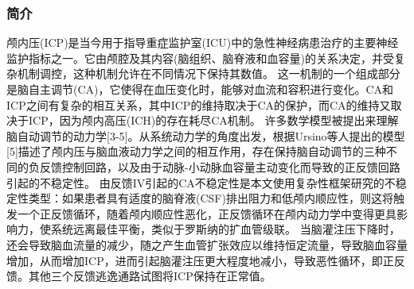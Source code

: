 \documentclass[titlepage,12pt]{article}
\begin{document}
\subsubsection{简介}
颅内压(ICP)是当今用于指导重症监护室(ICU)中的急性神经病患治疗的主要神经监护指标之一。它由颅腔及其内容(脑组织、脑脊液和血容量)的关系决定，并受复杂机制调控，这种机制允许在不同情况下保持其数值。
这一机制的一个组成部分是脑自主调节(CA)，它使得在血压变化时，能够对血流和容积进行变化。CA和ICP之间有复杂的相互关系，其中ICP的维持取决于CA的保护，而CA的维持又取决于ICP，因为颅内高压(ICH)的存在耗尽CA机制。
许多数学模型被提出来理解脑自动调节的动力学[3-5]。从系统动力学的角度出发，根据Ursino等人提出的模型[5]描述了颅内压与脑血液动力学之间的相互作用，存在保持脑自动调节的三种不同的负反馈控制回路，以及由于动脉-小动脉血容量主动变化而导致的正反馈回路引起的不稳定性。
由反馈IV引起的CA不稳定性是本文使用复杂性框架研究的不稳定性类型：如果患者具有适度的脑脊液(CSF)排出阻力和低颅内顺应性，则这将触发一个正反馈循环，随着颅内顺应性恶化，正反馈循环在颅内动力学中变得更具影响力，使系统远离最佳平衡，类似于罗斯纳的扩血管级联。
当脑灌注压下降时，还会导致脑血流量的减少，随之产生血管扩张效应以维持恒定流量，导致脑血容量增加，从而增加ICP，进而引起脑灌注压更大程度地减小，导致恶性循环，即正反馈。其他三个反馈逃逸通路试图将ICP保持在正常值。
\end{document}
